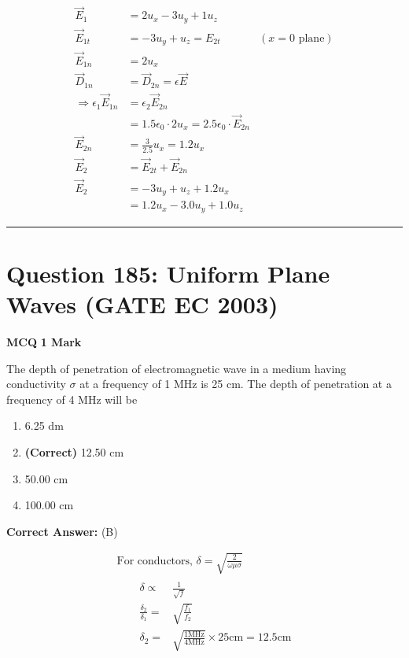 \documentclass[11pt,a4paper]{article}
\begin{document}
\begin{tcolorbox}[solbox, title=Detailed Solution -- Question 184]
\[
\begin{aligned} \vec{E}_{1} &=2 u_{x}-3 u_{y}+1 u_{z} \\ \vec{E}_{1 t} &=-3 u_{y}+u_{z}=E_{2 t} &(x=0 \text { plane}) \\ \vec{E}_{1 n} &=2 u_{x} \\ \vec{D}_{1 n} &=\vec{D}_{2 n}=\epsilon \vec{E} \\ \Rightarrow \epsilon_{1} \vec{E}_{1 n} &=\epsilon_{2} \vec{E}_{2 n} \\ &=1.5 \epsilon_{0} \cdot 2 u_{x}=2.5 \epsilon_{0} \cdot \vec{E}_{2 n} \\ \vec{E}_{2 n} &=\frac{3}{2.5} u_{x}=1.2 u_{x} \\ \vec{E}_{2} &=\vec{E}_{2 t}+\vec{E}_{2 n} \\ \vec{E}_{2} &=-3 u_{y}+u_{z}+1.2 u_{x} \\ &=1.2u_{x}-3.0u_{y}+1.0u_{z} \end{aligned}
\]
\end{tcolorbox}

\vspace{1.5em}
\hrule
\vspace{1.5em}

\section*{Question 185: Uniform Plane Waves (GATE EC 2003)}
\noindent \textbf{\color{primary}MCQ} \hfill \textbf{\color{secondary}1 Mark}


\noindent The depth of penetration of electromagnetic wave in a medium having conductivity $\sigma$ at a frequency of 1 MHz is 25 cm. The depth of penetration at a frequency of 4 MHz will be


\begin{enumerate}[label=(\Alph*)]
    \item 6.25 dm
    \item \textbf{(Correct)} 12.50 cm
    \item 50.00 cm
    \item 100.00 cm
\end{enumerate}

\noindent \textbf{Correct Answer:} (B)

\begin{tcolorbox}[solbox, title=Detailed Solution -- Question 185]
\[
\begin{array}{l} \text { For conductors, } \delta=\sqrt{\frac{2}{\omega \mu \sigma}} \\ \qquad \begin{aligned} \delta \propto & \frac{1}{\sqrt{f}} \\ \frac{\delta_{2}}{\delta_{1}}=& \sqrt{\frac{f_{1}}{f_{2}}} \\ \delta_{2}=& \sqrt{\frac{1 \mathrm{MHz}}{4 \mathrm{MHz}}} \times 25 \mathrm{cm}=12.5 \mathrm{cm} \end{aligned} \end{array}
\]
\end{tcolorbox}
\end{document}
